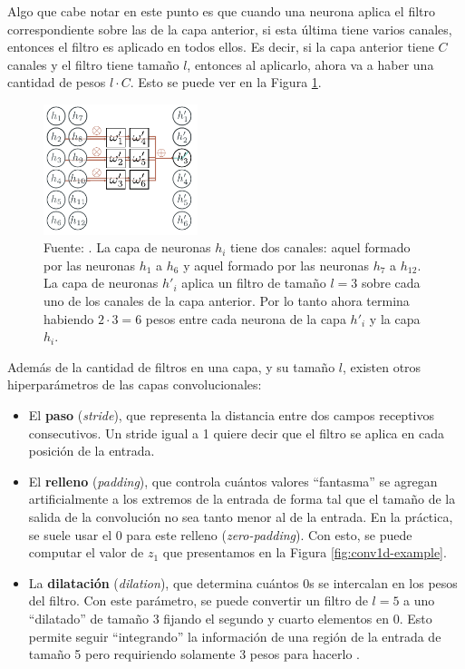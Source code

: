 \documentclass[../../main.tex]{subfiles}
\begin{document}
Algo que cabe notar en este punto es que cuando una neurona aplica el filtro
correspondiente sobre las de la capa anterior, si esta última tiene varios canales,
entonces el filtro es aplicado en todos ellos. Es decir, si la capa anterior tiene \(C\)
canales y el filtro tiene tamaño \(l\), entonces al aplicarlo, ahora va a haber una
cantidad de pesos \(l \cdot C\). Esto se puede ver en la Figura
\ref{fig:conv-layer-multi-channel}.

\begin{figure}
    \centering
    \includegraphics[width=0.4\textwidth]{figs/conv-layer-multi-channel.png}
    \caption{Fuente: \cite{prince2024understanding}. La capa de neuronas \(h_i\) tiene
    dos canales: aquel formado por las neuronas \(h_1\) a \(h_6\) y aquel formado
    por las neuronas \(h_7\) a \(h_{12}\). La capa de neuronas \(h'_i\) aplica un
    filtro de tamaño \(l=3\) sobre cada uno de los canales de la capa anterior. Por
    lo tanto ahora termina habiendo \(2 \cdot 3 = 6\) pesos entre cada neurona de la
    capa \(h'_i\) y la capa \(h_i\).}
    \label{fig:conv-layer-multi-channel}
\end{figure}

Además de la cantidad de filtros en una capa, y su tamaño \(l\), existen otros
hiperparámetros de las capas convolucionales: \vspace{-0.25cm}
\begin{itemize}[noitemsep]
    \item El \textbf{paso} (\textit{stride}), que representa la distancia entre dos campos receptivos
    consecutivos. Un stride igual a 1 quiere decir que el filtro se aplica en cada
    posición de la entrada.
    \item El \textbf{relleno} (\textit{padding}), que controla cuántos valores
    ``fantasma'' se agregan artificialmente a los extremos de la entrada de forma tal que
    el tamaño de la salida de la convolución no sea tanto menor al de la entrada. En la
    práctica, se suele usar el 0 para este relleno (\textit{zero-padding}). Con esto, se
    puede computar el valor de \(z_1\) que presentamos en la Figura
    \ref{fig:conv1d-example}.
    \item La \textbf{dilatación} (\textit{dilation}), que determina cuántos 0s se
    intercalan en los pesos del filtro. Con este parámetro, se puede convertir un filtro
    de \(l=5\) a uno ``dilatado'' de tamaño 3 fijando el segundo y cuarto elementos en 0.
    Esto permite seguir ``integrando'' la información de una región de la entrada de
    tamaño 5 pero requiriendo solamente 3 pesos para hacerlo
    \cite{prince2024understanding}.
\end{itemize}
\end{document}
